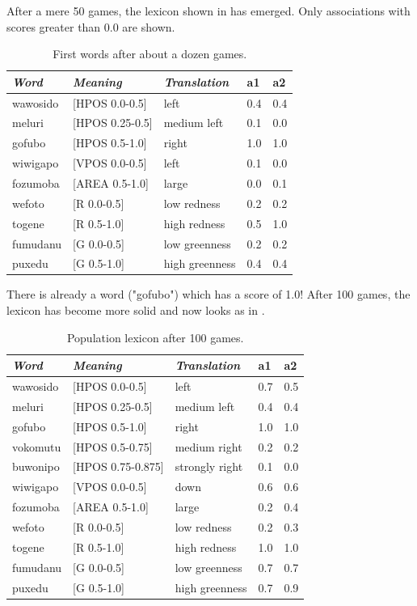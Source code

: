 After a mere 50 games, the lexicon shown in  has emerged. Only
associations with scores greater than 0.0 are shown. 
\begin{table}
\begin{center}
\begin{tabular}{ l  l  l  l  l } \midrule
{\it Word}&{\it Meaning}&{\it Translation} & {\bf a1}&{\bf a2} \\ \midrule
wawosido & [HPOS 0.0-0.5] &left&0.4&0.4\\ \midrule
meluri & [HPOS 0.25-0.5] &medium left&0.1&0.0\\ \midrule
gofubo & [HPOS 0.5-1.0]& right&1.0&1.0\\ \midrule
wiwigapo & [VPOS 0.0-0.5] &left&0.1&0.0\\ \midrule
fozumoba & [AREA 0.5-1.0]&large & 0.0&0.1\\ \midrule
wefoto & [R 0.0-0.5]& low redness &0.2&0.2\\ \midrule
togene & [R 0.5-1.0]& high redness &0.5&1.0\\ \midrule
fumudanu & [G 0.0-0.5]& low greenness &0.2&0.2\\ \midrule
puxedu & [G 0.5-1.0]& high greenness &0.4&0.4\\ \midrule
\end{tabular}
\caption{\label{tab:game50} First words after about a dozen games.}
\end{center}
\end{table}
There is already a word ("gofubo") which has
a score of 1.0! After 100 games, the lexicon has become more 
solid and now looks as in . 
\begin{table}
\begin{center}
\begin{tabular}{ l  l  l  l  l } \midrule
{\it Word}&{\it Meaning}&{\it Translation} & {\bf a1}&{\bf a2} \\ \midrule
wawosido & [HPOS 0.0-0.5] &left&0.7&0.5\\ \midrule
meluri & [HPOS 0.25-0.5] &medium left&0.4&0.4\\ \midrule
gofubo & [HPOS 0.5-1.0]& right&1.0&1.0\\ \midrule
vokomutu & [HPOS 0.5-0.75] &medium right&0.2&0.2\\ \midrule
buwonipo & [HPOS 0.75-0.875] &strongly right&0.1&0.0\\ \midrule
wiwigapo & [VPOS 0.0-0.5] &down&0.6&0.6\\ \midrule
fozumoba & [AREA 0.5-1.0]&large & 0.2&0.4\\ \midrule
wefoto & [R 0.0-0.5]& low redness &0.2&0.3\\ \midrule
togene & [R 0.5-1.0]& high redness &1.0&1.0\\ \midrule
fumudanu & [G 0.0-0.5]& low greenness &0.7&0.7\\ \midrule
puxedu & [G 0.5-1.0]& high greenness &0.7&0.9\\ \midrule
\end{tabular}
\caption{\label{tab:goubo} Population lexicon after 100 games.}
\end{center}
\end{table}

